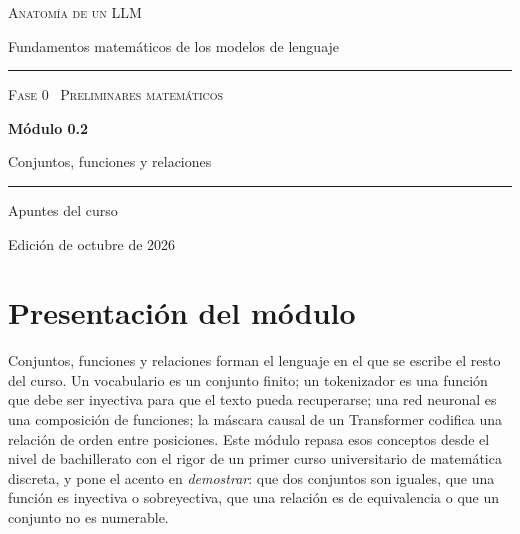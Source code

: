 \documentclass[11pt,a4paper,twoside,openany]{book}
\begin{document}
\frontmatter
\begin{titlepage}
\centering
\vspace*{2.5cm}
{\large\scshape Anatomía de un LLM}\par
\vspace{0.4cm}
{\normalsize Fundamentos matemáticos de los modelos de lenguaje}\par
\vspace{2.2cm}
\rule{\textwidth}{0.8pt}\par\vspace{0.5cm}
{\small\scshape Fase 0 \textperiodcentered\ Preliminares matemáticos}\par\vspace{0.3cm}
{\Huge\bfseries Módulo 0.2\par}\vspace{0.3cm}
{\LARGE Conjuntos, funciones y relaciones\par}
\vspace{0.5cm}\rule{\textwidth}{0.4pt}\par
\vspace{1.6cm}
{\large Apuntes del curso}\par
\vfill
{\small Edición de octubre de 2026}\par
\end{titlepage}

\chapter*{Presentación del módulo}

Conjuntos, funciones y relaciones forman el lenguaje en el que se escribe el resto del curso. Un vocabulario es un conjunto finito; un tokenizador es una función que debe ser inyectiva para que el texto pueda recuperarse; una red neuronal es una composición de funciones; la máscara causal de un Transformer codifica una relación de orden entre posiciones. Este módulo repasa esos conceptos desde el nivel de bachillerato con el rigor de un primer curso universitario de matemática discreta, y pone el acento en \emph{demostrar}: que dos conjuntos son iguales, que una función es inyectiva o sobreyectiva, que una relación es de equivalencia o que un conjunto no es numerable.
\end{document}
